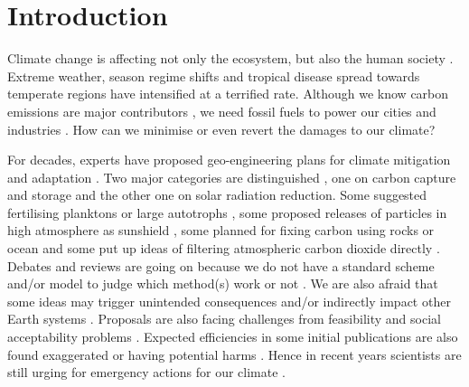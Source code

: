 \documentclass[../thesis.tex]{subfiles} %
\begin{document}
\section{Introduction}

Climate change is affecting not only the ecosystem, but also the human society \autocite{notz2016observed,schuur2015climate}.  Extreme weather, season regime shifts and tropical disease spread towards temperate regions have intensified at a terrified rate.  Although we know carbon emissions are major contributors \autocite{notz2016observed}, we need fossil fuels to power our cities and industries \autocite{ferguson2000electricity}.  How can we minimise or even revert the damages to our climate?

For decades, experts have proposed geo-engineering plans for climate mitigation and adaptation \autocite{farrelly2013carbon,yang2008progress,boyd2008ranking,boettcher2019high,vaughan2011review}.  Two major categories are distinguished \autocite{boyd2008ranking}, one on carbon capture and storage and the other one on solar radiation reduction.  Some suggested fertilising planktons \autocite{gnanadesikan2008export,lovelock2007ocean,lawrence2014efficiency} or large autotrophs \autocite{duarte2017can,johannessen2016geoengineering,krause2016substantial}, some proposed releases of particles in high atmosphere as sunshield \autocite{latham2008global,stjern2018response}, some planned for fixing carbon using rocks \autocite{stephens2008assessing,gunnarsson2018rapid} or ocean \autocite{salter200920,sant2014offshore} and some put up ideas of filtering atmospheric carbon dioxide directly \autocite{broecker2007co2,williamson2016emissions}.  Debates and reviews are going on because we do not have a standard scheme and/or model to judge which method(s) work or not \autocite{boyd2008ranking,boettcher2019high,boyd2016development,oschlies2017indicators,gattuso2018ocean}.  We are also afraid that some ideas may trigger unintended consequences \autocite{chung2011using,kwiatkowski2015atmospheric,lauvset2017climate,williamson2012impacts,trias2017high} and/or indirectly impact other Earth systems \autocite{ridgwell2011geographical,xia2016stratospheric,bala2011albedo}.  Proposals are also facing challenges from feasibility and social acceptability problems \autocite{boyd2008ranking,kamishiro2009public}.  Expected efficiencies in some initial publications are also found exaggerated \autocite{boyd2008implications,gnanadesikan2008export,oschlies2010side,thiele2012microbial} or having potential harms \autocite{batten2014did,trick2010iron,jones2009climate,muri2015tropical}.  Hence in recent years scientists are still urging for emergency actions for our climate \autocite{lenton2019foresight,van2017open}.
\end{document}
